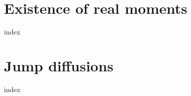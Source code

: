 \label{affine-processes:introduction}


\section{Existence of real moments}
\label{affine-processes:existence}
{index}

\section{Jump diffusions}
\label{affine-processes:jump-diffusions}
{index}
